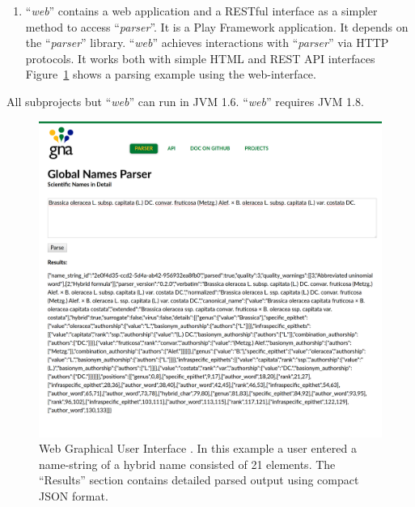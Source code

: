 \documentclass{bmcart}
\begin{document}
\begin{enumerate}
  \item ``\textit{web}'' contains a web application and a RESTful interface as
    a simpler method to access ``\textit{parser}''. It is a Play Framework
    \cite{wampler2011scala} application. It depends on the ``\textit{parser}''
    library. ``\textit{web}'' achieves interactions with ``\textit{parser}''
    via HTTP protocols. It works both with simple HTML and REST API interfaces
    Figure~\ref{figure:webgui} shows a parsing example using the web-interface.

\end{enumerate}

All subprojects but ``\textit{web}'' can run in JVM 1.6. ``\textit{web}''
requires JVM 1.8.

\begin{figure}[htbp]
  \begin{center}

    \caption{Web Graphical User Interface \cite{gnparser-web}. In this example
      a user entered a name-string of a hybrid name consisted of 21 elements.
      The ``Results'' section contains detailed parsed output using compact
      JSON format.}\label{figure:webgui}

    \vspace{5mm}
    \includegraphics[scale=0.175]{images/web_gui.png}
  \end{center}
\end{figure}
\end{document}
